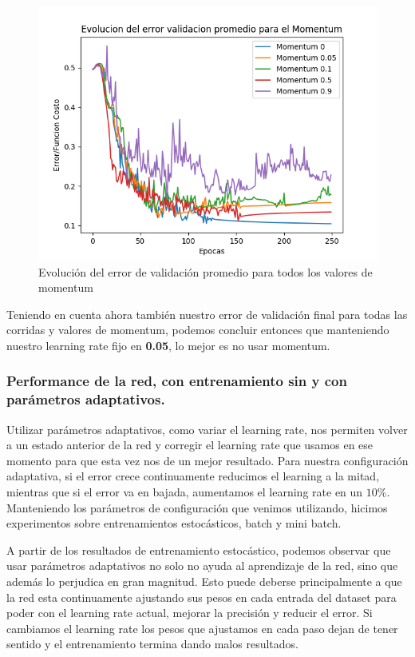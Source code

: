 \begin{figure}[!htbp]
  \begin{center}
  \includegraphics[scale=0.80]{graficos/momentum_promedios_validacion.png}
  \caption{Evolución del error de validación promedio para todos los valores de momentum}
  \end{center}
\end{figure}

Teniendo en cuenta ahora también nuestro error de validación final para todas las corridas y valores de momentum, podemos concluir entonces que manteniendo nuestro learning
rate fijo en \textbf{0.05}, lo mejor es no usar momentum.

\subsubsection{Performance de la red, con entrenamiento sin y con parámetros adaptativos.}

Utilizar parámetros adaptativos, como variar el learning rate, nos permiten volver a un estado anterior de la red y corregir el learning rate que usamos en 
ese momento para que esta vez nos de un mejor resultado. Para nuestra configuración adaptativa, si el error crece continuamente reducimos el learning a la mitad, 
mientras que si el error va en bajada, aumentamos el learning rate en un $10\%$. Manteniendo los parámetros de configuración que venimos utilizando, hicimos experimentos
sobre entrenamientos estocásticos, batch y mini batch. 

A partir de los resultados de entrenamiento estocástico, podemos observar que usar parámetros adaptativos no solo no ayuda al aprendizaje de la red, sino que
además lo perjudica en gran magnitud. Esto puede deberse principalmente a que la red esta continuamente ajustando sus pesos en cada entrada del dataset para
poder con el learning rate actual, mejorar la precisión y reducir el error. Si cambiamos el learning rate los pesos que ajustamos en cada paso dejan de tener
sentido y el entrenamiento termina dando malos resultados.

